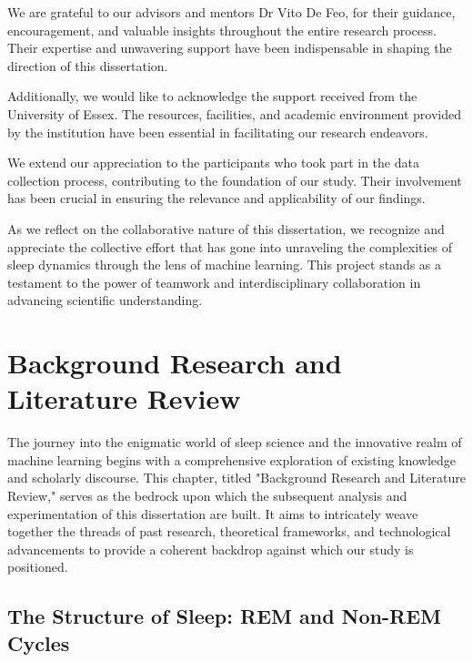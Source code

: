 \documentclass[12pt, a4paper,oneside]{book}
\numberwithin{equation}{section}
\begin{document}
We are grateful to our advisors and mentors Dr Vito De Feo, for their guidance, encouragement, and valuable insights throughout the entire research process. Their expertise and unwavering support have been indispensable in shaping the direction of this dissertation.

Additionally, we would like to acknowledge the support received from the University of Essex. The resources, facilities, and academic environment provided by the institution have been essential in facilitating our research endeavors.

We extend our appreciation to the participants who took part in the data collection process, contributing to the foundation of our study. Their involvement has been crucial in ensuring the relevance and applicability of our findings.

As we reflect on the collaborative nature of this dissertation, we recognize and appreciate the collective effort that has gone into unraveling the complexities of sleep dynamics through the lens of machine learning. This project stands as a testament to the power of teamwork and interdisciplinary collaboration in advancing scientific understanding.

\chapter{Background Research and
Literature Review}\label{ch:2}

The journey into the enigmatic world of sleep science and the innovative realm of machine learning begins with a comprehensive exploration of existing knowledge and scholarly discourse. This chapter, titled "Background Research and Literature Review," serves as the bedrock upon which the subsequent analysis and experimentation of this dissertation are built. It aims to intricately weave together the threads of past research, theoretical frameworks, and technological advancements to provide a coherent backdrop against which our study is positioned. 

\section{The Structure of Sleep: REM and Non-REM Cycles}\label{sec:2.1}
\end{document}
